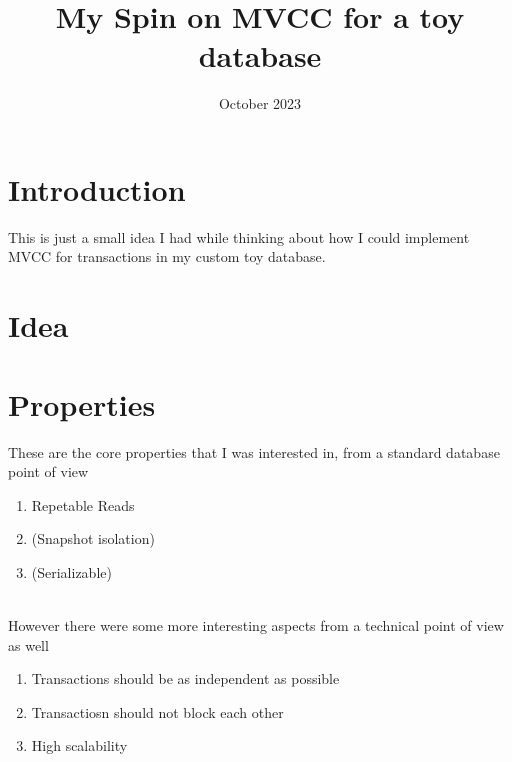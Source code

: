 \documentclass[a4paper, 11pt]{article}
\title{My Spin on MVCC for a toy database}
\date{October 2023}
\begin{document}
\section{Introduction}
This is just a small idea I had while thinking about how I could implement MVCC for transactions in my custom
toy database.

\section{Idea}


\section{Properties}
These are the core properties that I was interested in, from a standard database point of view
\begin{enumerate}
\item Repetable Reads
\item (Snapshot isolation)
\item (Serializable)
\end{enumerate} \\
However there were some more interesting aspects from a technical point of view as well
\begin{enumerate}
\item Transactions should be as independent as possible
\item Transactiosn should not block each other
\item High scalability
\end{enumerate}
\end{document}

